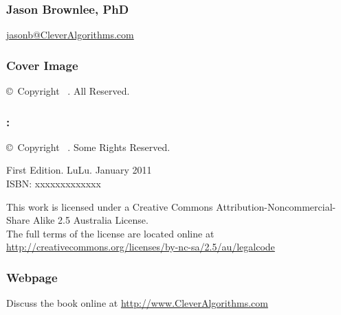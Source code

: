 
\newpage
\begin{flushleft}
\begin{small}

\vspace*{\fill}

\subsubsection*{Jason Brownlee, PhD}
\url{jasonb@CleverAlgorithms.com} \\
\vspace{0.5cm}


\subsubsection*{Cover Image}
\copyright\ Copyright \mybookdate\ \mybookauthor. All Reserved. \\
\vspace{0.5cm}


\subsubsection*{\mybooktitle: \mybooksubtitle}
\copyright\ Copyright \mybookdate\ \mybookauthor. Some Rights Reserved. \\
\vspace{0.5cm}

First Edition. LuLu. January 2011 \\
ISBN: xxxxxxxxxxxxx \\
\vspace{0.5cm}

This work is licensed under a Creative Commons Attribution\--Noncommercial\--Share Alike 2.5 Australia License. \\
The full terms of the license are located online at \url{http://creativecommons.org/licenses/by-nc-sa/2.5/au/legalcode} \\
\vspace{0.5cm}

\subsubsection*{Webpage}
Discuss the book online at \url{http://www.CleverAlgorithms.com}



\end{small}
\end{flushleft}
